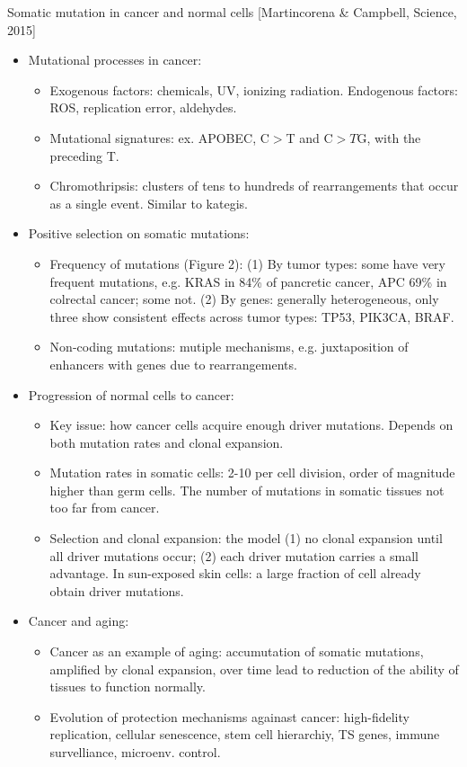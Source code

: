 \documentclass{report}
\begin{document}
Somatic mutation in cancer and normal cells [Martincorena \& Campbell, Science, 2015]
\begin{itemize}
	\item Mutational processes in cancer: 
	\begin{itemize}
		\item Exogenous factors: chemicals, UV, ionizing radiation. Endogenous factors: ROS, replication error, aldehydes. 
		\item Mutational signatures: ex. APOBEC, C$>$T and C$>T$G, with the preceding T. 
		\item Chromothripsis: clusters of tens to hundreds of rearrangements that occur as a single event. Similar to kategis. 
	\end{itemize}
	
	\item Positive selection on somatic mutations: 
	\begin{itemize}
		\item Frequency of mutations (Figure 2): (1) By tumor types: some have very frequent mutations, e.g. KRAS in 84\% of pancretic cancer, APC 69\% in colrectal cancer; some not. (2) By genes: generally heterogeneous, only three show consistent effects across tumor types: TP53, PIK3CA, BRAF. 
		\item Non-coding mutations: mutiple mechanisms, e.g. juxtaposition of enhancers with genes due to rearrangements. 
	\end{itemize}
	
	\item Progression of normal cells to cancer: 
	\begin{itemize}
		\item Key issue: how cancer cells acquire enough driver mutations. Depends on both mutation rates and clonal expansion.
		
		\item Mutation rates in somatic cells: 2-10 per cell division, order of magnitude higher than germ cells. The number of mutations in somatic tissues not too far from cancer. 
		
		\item Selection and clonal expansion: the model (1) no clonal expansion until all driver mutations occur; (2) each driver mutation carries a small advantage. In sun-exposed skin cells: a large fraction of cell already obtain driver mutations.  
	\end{itemize}
	
	\item Cancer and aging: 
	\begin{itemize}
		\item Cancer as an example of aging: accumutation of somatic mutations, amplified by clonal expansion, over time lead to reduction of the ability of tissues to function normally. 
		
		\item Evolution of protection mechanisms againast cancer: high-fidelity replication, cellular senescence, stem cell hierarchiy, TS genes, immune survelliance, microenv. control. 
	\end{itemize}
\end{itemize}
\end{document}
